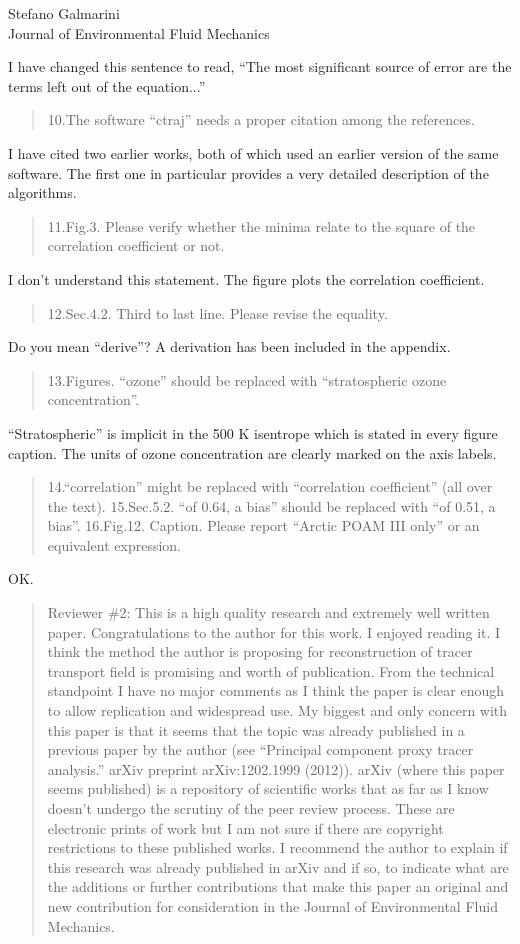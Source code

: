 \documentclass{letter}
\begin{document}
\begin{letter}{Stefano Galmarini\\
Journal of Environmental Fluid Mechanics}
\begin{quote}
\end{quote}
I have changed this sentence to read, ``The most significant source of error are the terms left out of the equation...''
\begin{quote}
10.The software ``ctraj'' needs a proper citation among the references.
\end{quote}
I have cited two earlier works, both of which used an earlier version of the same software. The first one in particular provides a very detailed description of the algorithms.
\begin{quote}
11.Fig.3. Please verify whether the minima relate to the square of the correlation coefficient or not.
\end{quote}
I don't understand this statement. The figure plots the correlation coefficient.
\begin{quote}
12.Sec.4.2. Third to last line. Please revise the equality.
\end{quote}
Do you mean ``derive''? A derivation has been included in the appendix.
\begin{quote}
13.Figures. ``ozone'' should be replaced with ``stratospheric ozone concentration''.
\end{quote}
``Stratospheric'' is implicit in the 500 K isentrope which is stated in 
every figure caption. The units of ozone concentration are clearly marked on the axis labels.
\begin{quote}
14.``correlation'' might be replaced with ``correlation coefficient'' (all over the text).
15.Sec.5.2. ``of 0.64, a bias'' should be replaced with ``of 0.51, a bias''.
16.Fig.12. Caption. Please report ``Arctic POAM III only'' or an equivalent expression.
\end{quote}
OK.

\begin{quote}
Reviewer \#2: This is a high quality research and extremely well written paper. Congratulations to the author for this work. I enjoyed reading it. I think the method the author is proposing for reconstruction of tracer transport field is promising and worth of publication. From the technical standpoint I have no major comments as I think the paper is clear enough to allow replication and widespread use. My biggest and only concern with this paper is that it seems that the topic was already published in a previous paper by the author (see ``Principal component proxy tracer analysis.'' arXiv preprint arXiv:1202.1999 (2012)). arXiv (where this paper seems published)  is a repository of scientific works that as far as I know doesn't undergo the scrutiny of the peer review process. These are electronic prints of work but I am not sure if there are copyright restrictions to these published works. I recommend the author to explain if this research was already published in arXiv and if
so, to indicate what are the additions or further contributions that make this paper an original and new contribution for consideration in the Journal of Environmental Fluid Mechanics.


\end{quote}
\end{letter}
\end{document}
